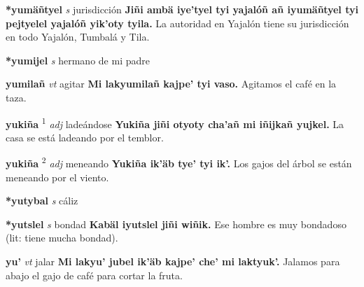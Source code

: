 \documentclass[10pt]{scrbook}
\newcommand{\entry}[1]{\textbf{#1}}
\newcommand{\defsuperscript}[1]{\textsuperscript{#1}}
\newcommand{\partofspeech}[1]{\textit{#1}}
\newcommand{\spanishtranslation}[1]{#1}
\newcommand{\cholexample}[1]{\textbf{#1}}
\newcommand{\exampletranslation}[1]{#1}
\begin{document}
\begin{multicols}{2}
\entry{*yumäñtyel}
\partofspeech{s}
\spanishtranslation{jurisdicción}
\cholexample{Jiñi ambä iye'tyel tyi yajalóñ añ iyumäñtyel tyi pejtyelel yajalóñ yik'oty tyila.}
\exampletranslation{La autoridad en Yajalón tiene su jurisdicción en todo Yajalón, Tumbalá y Tila.}

\entry{*yumijel}
\partofspeech{s}
\spanishtranslation{hermano de mi padre}

\entry{yumilañ}
\partofspeech{vt}
\spanishtranslation{agitar}
\cholexample{Mi lakyumilañ kajpe' tyi vaso.}
\exampletranslation{Agitamos el café en la taza.}

\entry{yukiña}
\defsuperscript{1}
\partofspeech{adj}
\spanishtranslation{ladeándose}
\cholexample{Yukiña jiñi otyoty cha'añ mi iñijkañ yujkel.}
\exampletranslation{La casa se está ladeando por el temblor.}

\entry{yukiña}
\defsuperscript{2}
\partofspeech{adj}
\spanishtranslation{meneando}
\cholexample{Yukiña ik'äb tye' tyi ik'.}
\exampletranslation{Los gajos del árbol se están meneando por el viento.}

\entry{*yutybal}
\partofspeech{s}
\spanishtranslation{cáliz}

\entry{*yutslel}
\partofspeech{s}
\spanishtranslation{bondad}
\cholexample{Kabäl iyutslel jiñi wiñik.}
\exampletranslation{Ese hombre es muy bondadoso (lit: tiene mucha bondad).}

\entry{yu'}
\partofspeech{vt}
\spanishtranslation{jalar}
\cholexample{Mi lakyu' jubel ik'äb kajpe' che' mi laktyuk'.}
\exampletranslation{Jalamos para abajo el gajo de café para cortar la fruta.}
\end{multicols}
\end{document}
